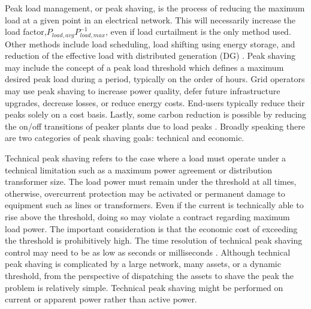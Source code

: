 \documentclass[journal,article,submit,pdftex,moreauthors]{Definitions/mdpi}
\begin{document}
Peak load management, or peak shaving, is the process of reducing the maximum load at a given point in an electrical network. This will necessarily increase the load factor,$P_{load,avg} P_{load,max}^{-1}$, even if load curtailment is the only method used. Other methods include load scheduling, load shifting using energy storage, and reduction of the effective load with distributed generation (DG) \cite{Uddin2018}. Peak shaving may include the concept of a peak load threshold which defines a maximum desired peak load during a period, typically on the order of hours. Grid operators may use peak shaving to increase power quality, defer future infrastructure upgrades, decrease losses, or reduce energy costs. End-users typically reduce their peaks solely on a cost basis. Lastly, some carbon reduction is possible by reducing the on/off transitions of peaker plants due to load peaks \cite{Uddin2018}. Broadly speaking there are two categories of peak shaving goals: technical and economic.



Technical peak shaving refers to the case where a load must operate under a technical limitation such as a maximum power agreement or distribution transformer size. The load power must remain under the threshold at all times, otherwise, overcurrent protection may be activated or permanent damage to equipment such as lines or transformers. Even if the current is technically able to rise above the threshold, doing so may violate a contract regarding maximum load power. The important consideration is that the economic cost of exceeding the threshold is prohibitively high. The time resolution of technical peak shaving control may need to be as low as seconds or milliseconds \cite{Iannarelli2020}. Although technical peak shaving is complicated by a large network, many assets, or a dynamic threshold, from the perspective of dispatching the assets to shave the peak the problem is relatively simple. Technical peak shaving might be performed on current or apparent power rather than active power.
\end{document}
